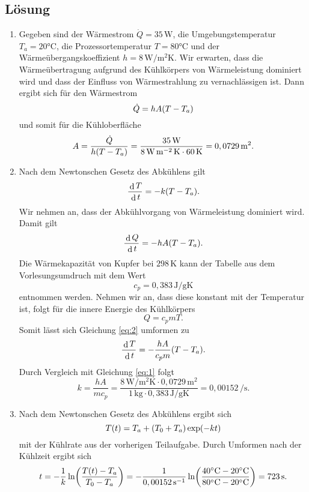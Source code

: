 \documentclass[german,12pt]{homework}
\newcommand{\dd}{\,\differ}
\DeclareMathOperator{\differ}{d}
\DeclarePairedDelimiter{\enbrace}{(}{)}
\newcommand{\sis}[1]{\,\si{#1}}
\newcommand{\degC}{\si{\degreeCelsius}}
\begin{document}
    \subsection*{Lösung}
    \begin{enumerate}
        \item Gegeben sind der Wärmestrom \(\dot{Q} = 35\sis{\watt}\), die
        Umgebungstemperatur \(T_a = 20\degC\), die Prozessortemperatur
        \(T = 80\degC\) und der Wärmeübergangskoeffizient
        \(h = 8\sis{\watt\per\meter\squared\kelvin}\). Wir erwarten, dass
        die Wärmeübertragung aufgrund des Kühlkörpers von Wärmeleistung
        dominiert wird und dass der Einfluss von Wärmestrahlung zu
        vernachlässigen ist. Dann ergibt sich für den Wärmestrom
        \[\dot{Q} = hA\enbrace*{T - T_a}\]
        und somit für die Kühloberfläche
        \[A = \frac{\dot{Q}}{h\enbrace*{T - T_a}} =
        \frac{35\sis{\watt}}{8\sis{\watt\per\meter\squared\kelvin} \cdot
        60\sis{\kelvin}} = 0,0729\sis{\meter\squared}.\]
        \item Nach dem Newtonschen Gesetz des Abkühlens gilt
        \begin{equation}\label{eq:1}
            \frac{\dd{T}}{\dd{t}} = -k\enbrace*{T - T_a}.
        \end{equation}
        Wir nehmen an, dass der Abkühlvorgang von Wärmeleistung dominiert wird.
        Damit gilt
        \begin{equation}\label{eq:2}
            \frac{\dd{Q}}{\dd{t}} = -hA\enbrace*{T - T_a}.
        \end{equation}
        Die Wärmekapazität von Kupfer bei \(298\sis{\kelvin}\) kann der
        Tabelle aus dem Vorlesungsumdruch mit dem Wert
        \[c_p = 0,383\sis{\joule\per\gram\kelvin}\]
        entnommen werden. Nehmen wir an, dass diese konstant mit der Temperatur
        ist, folgt für die innere Energie des Kühlkörpers
        \[Q = c_pmT.\]
        Somit lässt sich Gleichung \eqref{eq:2} umformen zu
        \[\frac{\dd{T}}{\dd{t}} = -\frac{hA}{c_pm}\enbrace*{T - T_a}.\]
        Durch Vergleich mit Gleichung \eqref{eq:1} folgt
        \[k = \frac{hA}{mc_p} = \frac{8\sis{\watt\per\meter\squared\kelvin}
        \cdot 0,0729\sis{\meter\squared}}{1\sis{\kilogram} \cdot 0,383
        \sis{\joule\per\gram\kelvin}} = 0,00152\sis{\per\second}.\]
        \item Nach dem Newtonschen Gesetz des Abkühlens ergibt sich
        \[T\enbrace*{t} = T_a + \enbrace*{T_0 + T_a}\exp\enbrace*{-kt}\]
        mit der Kühlrate aus der vorherigen Teilaufgabe. Durch Umformen nach der
        Kühlzeit ergibt sich
        \[t = -\frac{1}{k}\ln\enbrace*{\frac{T\enbrace*{t} - T_a}{T_0 - T_a}}
        = -\frac{1}{0,00152\sis{\per\second}}\ln\enbrace*{\frac{40\degC -
        20\degC}{80\degC - 20\degC}} = 723\sis{\second}.\]
    \end{enumerate}
\end{document}
